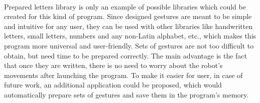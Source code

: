 \mbox{}\\
Prepared letters library is only an example of possible libraries which could be created for this kind of program. Since designed gestures are meant to be simple and intuitive for any user, they can be used with other libraries like handwritten letters, small letters, numbers and any non-Latin alphabet, etc., which makes this program more universal and user-friendly. Sets of gestures are not too difficult to obtain, but need time to be prepared correctly. The main advantage is the fact that once they are written, there is no need to worry about the robot’s movements after launching the program. To make it easier for user, in case of future work, an additional application could be proposed, which would automatically prepare sets of gestures and save them in the program’s memory.

